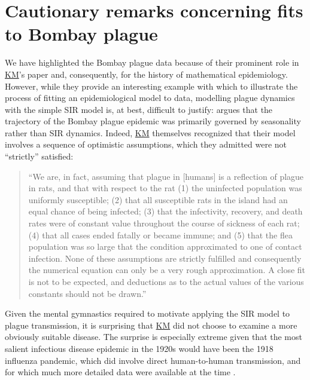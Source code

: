 \documentclass[]{interact}\usepackage[]{graphicx}\usepackage[]{xcolor}
\theoremstyle{plain}%
\theoremstyle{definition}
\theoremstyle{remark}
\newcommand{\KM}{\protect\hyperlink{cite.KermMcKe27}{KM}\xspace}
\newcommand{\KMpage}[1]{\protect\hyperlink{cite.KermMcKe27}{KM [p.\,#1]}\xspace}
\begin{document}












\section{Cautionary remarks concerning fits to Bombay plague}

We have highlighted the Bombay plague data because of their prominent
role in \KM's paper \citep{KermMcKe27} and, consequently, for the
history of mathematical epidemiology.  However, while they provide an
interesting example with which to illustrate the process of fitting an
epidemiological model to data, modelling plague dynamics with the
simple SIR model is, at best, difficult to justify:
\citet{bacaermodel2012} argues that the trajectory of the Bombay
plague epidemic was primarily governed by seasonality rather than SIR
dynamics.  Indeed, \KM themselves recognized that their model
involves a sequence of optimistic assumptions, which they admitted
were not ``strictly'' satisfied:

\begin{quote}
  ``We are, in fact, assuming that plague in [humans] is a reflection
  of plague in rats, and that with respect to the rat (1) the
  uninfected population was uniformly susceptible; (2) that all
  susceptible rats in the island had an equal chance of being
  infected; (3) that the infectivity, recovery, and death rates were
  of constant value throughout the course of sickness of each rat; (4)
  that all cases ended fatally or became immune; and (5) that the flea
  population was so large that the condition approximated to one of
  contact infection.  None of these assumptions are strictly fulfilled
  and consequently the numerical equation can only be a very rough
  approximation. A close fit is not to be expected, and deductions as
  to the actual values of the various constants should not be
  drawn.''


  \rightline{--- \KMpage{715}}
\end{quote}

\noindent
Given the mental gymnastics required to motivate applying the SIR
model to plague transmission, it is surprising that \KM did not choose
to examine a more obviously suitable disease.  The surprise is
especially extreme given that the most salient infectious disease
epidemic in the 1920s would have been the 1918 influenza pandemic,
which did involve direct human-to-human transmission, and for which
much more detailed data were available at the time
\citep{Roge20,Fros20,Eich23}.
\end{document}
